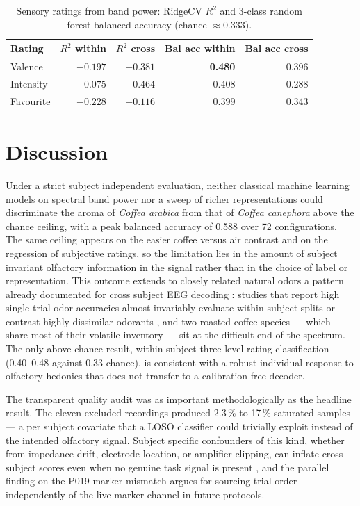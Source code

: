 \documentclass[conference]{IEEEtran}
\begin{document}
\begin{table}[ht]
  \centering
  \caption{Sensory ratings from band power: RidgeCV $R^2$ and 3-class random forest balanced accuracy (chance $\approx 0.333$).}
  \label{tab:sensory}
  \footnotesize
  \setlength{\tabcolsep}{4pt}
  \begin{tabular}{l r r r r}
    \toprule
    \textbf{Rating} & \textbf{$R^2$ within} & \textbf{$R^2$ cross} & \textbf{Bal acc within} & \textbf{Bal acc cross} \\
    \midrule
    Valence   & $-0.197$ & $-0.381$ & \textbf{0.480} & 0.396 \\
    Intensity & $-0.075$ & $-0.464$ & 0.408          & 0.288 \\
    Favourite & $-0.228$ & $-0.116$ & 0.399          & 0.343 \\
    \bottomrule
  \end{tabular}
\end{table}

\section{Discussion}
Under a strict subject independent evaluation, neither classical machine learning models on spectral band power nor a sweep of richer representations could discriminate the aroma of \textit{Coffea arabica} from that of \textit{Coffea canephora} above the chance ceiling, with a peak balanced accuracy of 0.588 over 72 configurations. The same ceiling appears on the easier coffee versus air contrast and on the regression of subjective ratings, so the limitation lies in the amount of subject invariant olfactory information in the signal rather than in the choice of label or representation. This outcome extends to closely related natural odors a pattern already documented for cross subject EEG decoding \cite{lotte2018}: studies that report high single trial odor accuracies almost invariably evaluate within subject splits or contrast highly dissimilar odorants \cite{kroupi2014,aydemir2017,hou2025}, and two roasted coffee species --- which share most of their volatile inventory --- sit at the difficult end of the spectrum. The only above chance result, within subject three level rating classification (0.40--0.48 against 0.33 chance), is consistent with a robust individual response to olfactory hedonics that does not transfer to a calibration free decoder.

The transparent quality audit was as important methodologically as the headline result. The eleven excluded recordings produced 2.3\,\% to 17\,\% saturated samples --- a per subject covariate that a LOSO classifier could trivially exploit instead of the intended olfactory signal. Subject specific confounders of this kind, whether from impedance drift, electrode location, or amplifier clipping, can inflate cross subject scores even when no genuine task signal is present \cite{lotte2018}, and the parallel finding on the P019 marker mismatch argues for sourcing trial order independently of the live marker channel in future protocols.
\end{document}
